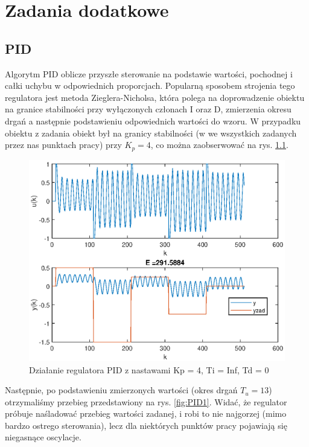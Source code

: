 \chapter{Zadania dodatkowe}
	\label{ch:dod}
	\section{PID}
		\label{sec:PID}
		Algorytm PID oblicze przyszłe sterowanie na podstawie wartości, pochodnej i całki uchybu w odpowiednich proporcjach. Popularną sposobem strojenia tego regulatora jest metoda Zieglera-Nicholsa, która polega na doprowadzenie obiektu na granice stabilności przy wyłączonych członach I oraz D, zmierzenia okresu drgań a następnie podstawieniu odpowiednich wartości do wzoru. W przypadku obiektu z zadania obiekt był na granicy stabilności (w we wszystkich zadanych przez nas punktach pracy) przy $K_p=4$, co można zaobserwować na rys. \ref{fig:PID0}.
		
		\begin{figure}[h!]
			\centering
			\includegraphics[width=\linewidth]{img/strojeniePID_Kp_4_Ti_duzo_Td_0.eps}
			\caption{Działanie regulatora PID z nastawami Kp = 4, Ti = Inf, Td = 0}
			\label{fig:PID0}
		\end{figure}
		
		Następnie, po podstawieniu zmierzonych wartości (okres drgań $T_u=13$) otrzymaliśmy przebieg przedstawiony na rys. \ref{fig:PID1}.
		Widać, że regulator próbuje naśladować przebieg wartości zadanej, i robi to nie najgorzej (mimo bardzo ostrego sterowania), lecz dla niektórych punktów pracy pojawiają się niegasnące oscylacje.
		
